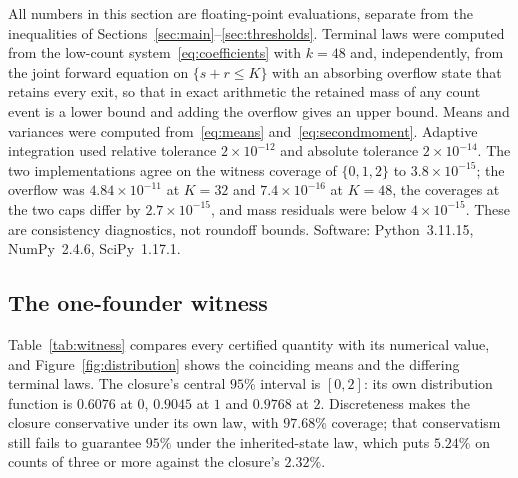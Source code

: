 \documentclass[11pt,a4paper]{article}
\theoremstyle{plain}
\theoremstyle{definition}
\theoremstyle{remark}
\begin{document}
All numbers in this section are floating-point evaluations, separate from the inequalities of Sections~\ref{sec:main}--\ref{sec:thresholds}. Terminal laws were computed from the low-count system~\eqref{eq:coefficients} with $k=48$ and, independently, from the joint forward equation on $\{s+r\le K\}$ with an absorbing overflow state that retains every exit, so that in exact arithmetic the retained mass of any count event is a lower bound and adding the overflow gives an upper bound. Means and variances were computed from~\eqref{eq:means} and~\eqref{eq:secondmoment}. Adaptive integration used relative tolerance $2\times10^{-12}$ and absolute tolerance $2\times10^{-14}$. The two implementations agree on the witness coverage of $\{0,1,2\}$ to $3.8\times10^{-15}$; the overflow was $4.84\times10^{-11}$ at $K=32$ and $7.4\times10^{-16}$ at $K=48$, the coverages at the two caps differ by $2.7\times10^{-15}$, and mass residuals were below $4\times10^{-15}$. These are consistency diagnostics, not roundoff bounds. Software: Python~3.11.15, NumPy~2.4.6, SciPy~1.17.1.

\subsection{The one-founder witness}
Table~\ref{tab:witness} compares every certified quantity with its numerical value, and Figure~\ref{fig:distribution} shows the coinciding means and the differing terminal laws. The closure's central $95\%$ interval is $[0,2]$: its own distribution function is $0.6076$ at $0$, $0.9045$ at $1$ and $0.9768$ at $2$. Discreteness makes the closure conservative under its own law, with $97.68\%$ coverage; that conservatism still fails to guarantee $95\%$ under the inherited-state law, which puts $5.24\%$ on counts of three or more against the closure's $2.32\%$.
\end{document}
